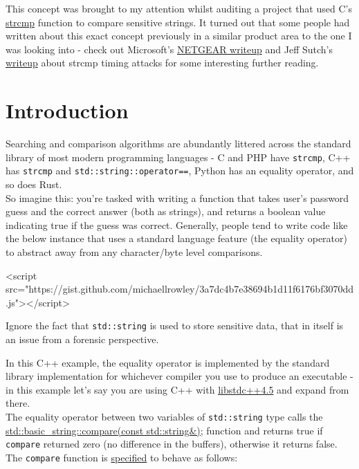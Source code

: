 This concept was brought to my attention whilst auditing a project that used C's \href{https://pubs.opengroup.org/onlinepubs/009604499/functions/strcmp.html}{strcmp}
			function to compare sensitive strings. It turned out that some people had written about this exact concept
			previously in a similar product area to the one I was looking into - check out Microsoft's \href{https://www.microsoft.com/en-us/security/blog/2021/06/30/microsoft-finds-new-netgear-firmware-vulnerabilities-that-could-lead-to-identity-theft-and-full-system-compromise/}{NETGEAR writeup}
			and Jeff Sutch's \href{https://github.com/jsutch/strcmp_timing_attacks_demo}{writeup} about strcmp timing attacks for some interesting further reading.

\section{Introduction}

Searching and comparison algorithms are abundantly littered across the standard library of most modern programming languages - C and PHP have
			\texttt{strcmp}, C++ has \texttt{strcmp} and \texttt{std::string::operator==},
			Python has an equality operator, and so does Rust.\\

			So imagine this: you're tasked with writing a function that takes user's password guess and the correct answer
			(both as strings), and returns a boolean value indicating true if the guess was correct.
			Generally, people tend to write code like the below instance that uses a standard language feature (the equality operator)
			to abstract away from any character/byte level comparisons.

\begin{rawhtml}
<script src="https://gist.github.com/michaellrowley/3a7dc4b7e38694b1d11f6176bf3070dd.js"></script>
\end{rawhtml}

Ignore the fact that \texttt{std::string} is used to store sensitive data, that in itself is an issue from a forensic perspective.

In this C++ example, the equality operator is implemented by the standard library implementation for whichever compiler you use to produce an executable -
			in this example let's say you are using C++ with \href{https://gcc.gnu.org/onlinedocs/libstdc++/libstdc++-api-4.5/}{libstdc++4.5} and expand from there.\\

			The equality operator between two variables of \texttt{std::string} type calls the
			\href{https://gcc.gnu.org/onlinedocs/libstdc++/libstdc++-api-4.5/a00258.html#a206b096f59ca71864c3ad5f80065e582}{std::basic\_string::compare(const std::string\&);}
			function and returns true if \texttt{compare} returned zero (no difference in the buffers), otherwise it returns false. The
			\texttt{compare} function is \href{https://cplusplus.com/reference/string/char_traits/compare/}{specified} to behave as follows:

